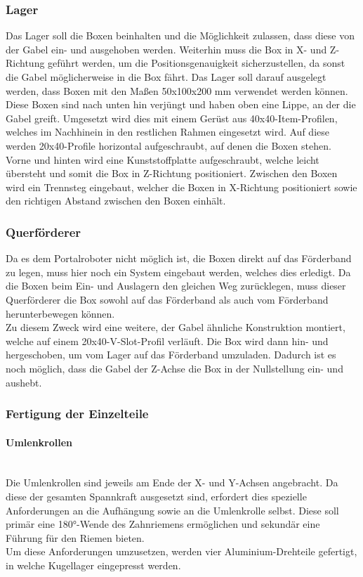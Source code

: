 \subsubsection{Lager}
Das Lager soll die Boxen beinhalten und die Möglichkeit zulassen, dass diese von der Gabel ein- und ausgehoben werden. Weiterhin muss die Box in X- und Z-Richtung geführt werden, um die Positionsgenauigkeit sicherzustellen, da sonst die Gabel möglicherweise in die Box fährt. Das Lager soll darauf ausgelegt werden, dass Boxen mit den Maßen 50x100x200 mm verwendet werden können. Diese Boxen sind nach unten hin verjüngt und haben oben eine Lippe, an der die Gabel greift.
Umgesetzt wird dies mit einem Gerüst aus 40x40-Item-Profilen, welches im Nachhinein in den restlichen Rahmen eingesetzt wird. Auf diese werden 20x40-Profile horizontal aufgeschraubt, auf denen die Boxen stehen. Vorne und hinten wird eine Kunststoffplatte aufgeschraubt, welche leicht übersteht und somit die Box in Z-Richtung positioniert. Zwischen den Boxen wird ein Trennsteg eingebaut, welcher die Boxen in X-Richtung positioniert sowie den richtigen Abstand zwischen den Boxen einhält.

\subsubsection{Querförderer}
Da es dem Portalroboter nicht möglich ist, die Boxen direkt auf das Förderband zu legen, muss hier noch ein System eingebaut werden, welches dies erledigt. Da die Boxen beim Ein- und Auslagern den gleichen Weg zurücklegen, muss dieser Querförderer die Box sowohl auf das Förderband als auch vom Förderband herunterbewegen können.\\
Zu diesem Zweck wird eine weitere, der Gabel ähnliche Konstruktion montiert, welche auf einem 20x40-V-Slot-Profil verläuft. Die Box wird dann hin- und hergeschoben, um vom Lager auf das Förderband umzuladen. Dadurch ist es noch möglich, dass die Gabel der Z-Achse die Box in der Nullstellung ein- und aushebt.


\subsubsection{Fertigung der Einzelteile}

\paragraph{Umlenkrollen}\mbox{}\\
Die Umlenkrollen sind jeweils am Ende der X- und Y-Achsen angebracht. Da diese der gesamten Spannkraft ausgesetzt sind, erfordert dies spezielle Anforderungen an die Aufhängung sowie an die Umlenkrolle selbst. Diese soll primär eine 180°-Wende des Zahnriemens ermöglichen und sekundär eine Führung für den Riemen bieten.\\
Um diese Anforderungen umzusetzen, werden vier Aluminium-Drehteile gefertigt, in welche Kugellager eingepresst werden.

